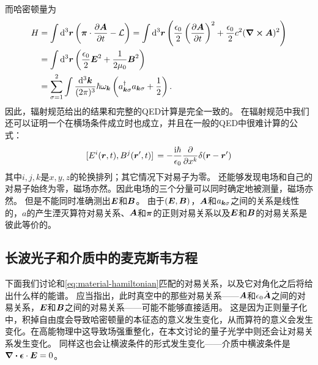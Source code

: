 而哈密顿量为
\begin{equation}
    \begin{aligned}
        H &= \int \dd[3]{\vb*{r}} \left(\vb*{\pi} \cdot \pdv{\vb*{A}}{t} - \mathcal{L} \right) = \int \dd[3]{\vb*{r}} \left( \frac{\epsilon_0}{2} \left(\pdv{\vb*{A}}{t}\right)^2 + \frac{\epsilon_0}{2} c^2 (\curl{\vb*{A}})^2 \right) \\
        &= \int \dd[3]{\vb*{r}} \left( \frac{\epsilon_0}{2} \vb*{E}^2 + \frac{1}{2\mu_0} \vb*{B}^2 \right) \\
        &= \sum_{\sigma=1}^2 \int \frac{\dd[3]{\vb*{k}}}{(2\pi)^3} \hbar \omega_{\vb*{k}} \left(a^\dagger_{\vb*{k} \sigma} a_{\vb*{k} \sigma} + \frac{1}{2} \right).
    \end{aligned}
\end{equation}
因此，辐射规范给出的结果和完整的QED计算是完全一致的。
在辐射规范中我们还可以证明一个在横场条件成立时也成立，并且在一般的QED中很难计算的公式：
\begin{equation}
    \comm*{E^i(\vb*{r}, t)}{B^j(\vb*{r}', t)} = - \frac{\ii \hbar}{\epsilon_0} \pdv{x^k} \delta(\vb*{r} - \vb*{r}')
\end{equation}
其中$i, j, k$是$x, y, z$的轮换排列；其它情况下对易子为零。
还能够发现电场和自己的对易子始终为零，磁场亦然。因此电场的三个分量可以同时确定地被测量，磁场亦然。
但是不能同时准确测出$\vb*{E}$和$\vb*{B}$。
由于$(\vb*{E}, \vb*{B})$，$\vb*{A}$和$a_{\vb*{k} \sigma}$之间的关系是线性的，$a$的产生湮灭算符对易关系、$\vb*{A}$和$\vb*{\pi}$的正则对易关系以及$\vb*{E}$和$\vb*{B}$的对易关系是彼此等价的。



\subsection{长波光子和介质中的麦克斯韦方程}\label{sec:long-wavelength-photon-maxwell-general}

下面我们讨论和\eqref{eq:material-hamiltonian}匹配的对易关系，以及它对角化之后将给出什么样的能谱。
应当指出，此时真空中的那些对易关系——$\vb*{A}$和$\epsilon_0 \dot{\vb*{A}}$之间的对易关系，$\vb*{E}$和$\vb*{B}$之间的对易关系——可能不能够直接适用。
这是因为正则量子化中，积掉自由度会导致哈密顿量的本征态的意义发生变化，从而算符的意义会发生变化。在高能物理中这导致场强重整化，在本文讨论的量子光学中则还会让对易关系发生变化。
同样这也会让横波条件的形式发生变化——介质中横波条件是$\div{\vb*{\epsilon} \cdot \vb*{E}} = 0$。

